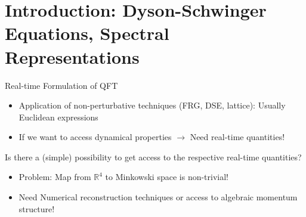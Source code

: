 \section{Introduction: Dyson-Schwinger Equations, Spectral Representations}

\begin{frame}{Real-time Formulation of QFT}
\addtocounter{framenumber}{-1}
\begin{itemize}
	\item Application of \alert{non-perturbative} techniques (FRG, DSE, lattice): Usually \alert{Euclidean} expressions\\[1em]
	\item If we want to access \alert{dynamical properties} $\rightarrow$ Need \alert{real-time} quantities!\\[1em]
\end{itemize}
\vfill
\alert{Is there a (simple) possibility to get access to the respective real-time quantities?}
\vfill
\begin{itemize}
	\item Problem: Map from $\mathbb{R}^4$ to Minkowski space is non-trivial! \\[1em]
	\item Need \alert{Numerical reconstruction techniques} or access to \alert{algebraic momentum structure}!
\end{itemize}



\end{frame}

